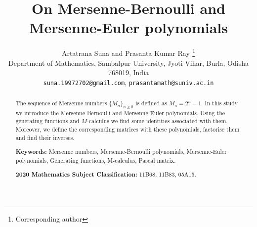 \documentclass[12pt, a4paper]{article}
\newcommand{\firstpage}[1]{\setcounter{page}{#1}}
\begin{document}
\title{On Mersenne-Bernoulli and Mersenne-Euler polynomials}

\author{Artatrana Suna and Prasanta Kumar Ray$^{}$%
  \footnote{Corresponding author}\\
  \small Department of Mathematics, Sambalpur University,
  \small Jyoti Vihar, Burla, Odisha 768019, India\\
  \small\texttt{suna.19972702@gmail.com},\quad
  \texttt{prasantamath@suniv.ac.in}}

\firstpage{1}

\maketitle

\begin{abstract}
The sequence of Mersenne numbers $\{M_n\}_{n\geq 0}$ is defined as $M_n = 2^n-1.$ In this study we introduce the Mersenne-Bernoulli and Mersenne-Euler polynomials. Using the generating functions and $M$-calculus we find some identities associated with them. Moreover, we define the corresponding matrices with these polynomials, factorise them and find their inverses.

\vspace{1em}
\noindent \textbf{Keywords:} Mersenne numbers, Mersenne-Bernoulli polynomials, Mersenne-Euler polynomials, Generating functions, M-calculus, Pascal matrix.

\noindent \textbf{2020 Mathematics Subject Classification:} 11B68, 11B83, 05A15.
\end{abstract}

\end{document}
